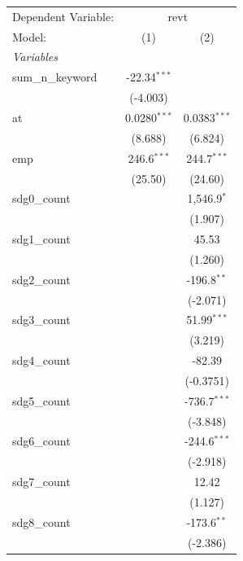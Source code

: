 
\begingroup
\centering
\begin{tabular}{lcc}
   \tabularnewline \midrule \midrule
   Dependent Variable: & \multicolumn{2}{c}{revt}\\
   Model:            & (1)            & (2)\\  
   \midrule
   \emph{Variables}\\
   sum\_n\_keyword   & -22.34$^{***}$ &   \\   
                     & (-4.003)       &   \\   
   at                & 0.0280$^{***}$ & 0.0383$^{***}$\\   
                     & (8.688)        & (6.824)\\   
   emp               & 246.6$^{***}$  & 244.7$^{***}$\\   
                     & (25.50)        & (24.60)\\   
   sdg0\_count       &                & 1,546.9$^{*}$\\   
                     &                & (1.907)\\   
   sdg1\_count       &                & 45.53\\   
                     &                & (1.260)\\   
   sdg2\_count       &                & -196.8$^{**}$\\   
                     &                & (-2.071)\\   
   sdg3\_count       &                & 51.99$^{***}$\\   
                     &                & (3.219)\\   
   sdg4\_count       &                & -82.39\\   
                     &                & (-0.3751)\\   
   sdg5\_count       &                & -736.7$^{***}$\\   
                     &                & (-3.848)\\   
   sdg6\_count       &                & -244.6$^{***}$\\   
                     &                & (-2.918)\\   
   sdg7\_count       &                & 12.42\\   
                     &                & (1.127)\\   
   sdg8\_count       &                & -173.6$^{**}$\\   
                     &                & (-2.386)\\   

\end{tabular}
